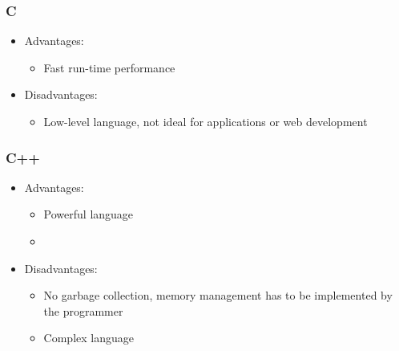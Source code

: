 \documentclass{article}
\begin{document}
			\subsubsection{C}
			
				\begin{itemize}
					\item Advantages:
						\begin{itemize}
							\item Fast run-time performance
						\end{itemize}
						
					\item Disadvantages:
						\begin{itemize}
							\item Low-level language, not ideal for applications or web development
						\end{itemize}
				\end{itemize}
				
			\subsubsection{C++}
			
				\begin{itemize}
					\item Advantages:
						\begin{itemize}
							\item Powerful language
							\item 
						\end{itemize}
						
					\item Disadvantages:
						\begin{itemize}
							\item No garbage collection, memory management has to be implemented by the programmer
							\item Complex language
						\end{itemize}
				\end{itemize}
				
\end{document}
